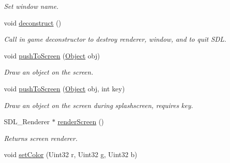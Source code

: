 \begin{DoxyCompactItemize}
\begin{DoxyCompactList}\small\item\em Set window name. \end{DoxyCompactList}\item 
void \hyperlink{classEngine_a9c0b65f41a2991857265f7be0a177e13}{deconstruct} ()\hypertarget{classEngine_a9c0b65f41a2991857265f7be0a177e13}{}\label{classEngine_a9c0b65f41a2991857265f7be0a177e13}

\begin{DoxyCompactList}\small\item\em Call in game deconstructor to destroy renderer, window, and to quit S\+DL. \end{DoxyCompactList}\item 
void \hyperlink{classEngine_a6adc1b843b8874274c0db6f95e705ef5}{push\+To\+Screen} (\hyperlink{classObject}{Object} obj)\hypertarget{classEngine_a6adc1b843b8874274c0db6f95e705ef5}{}\label{classEngine_a6adc1b843b8874274c0db6f95e705ef5}

\begin{DoxyCompactList}\small\item\em Draw an object on the screen. \end{DoxyCompactList}\item 
void \hyperlink{classEngine_a42800416f18b300577e3c0685103afe2}{push\+To\+Screen} (\hyperlink{classObject}{Object} obj, int key)\hypertarget{classEngine_a42800416f18b300577e3c0685103afe2}{}\label{classEngine_a42800416f18b300577e3c0685103afe2}

\begin{DoxyCompactList}\small\item\em Draw an object on the screen during splashscreen, requires key. \end{DoxyCompactList}\item 
S\+D\+L\+\_\+\+Renderer $\ast$ \hyperlink{classEngine_a0ace821c5c3f1b2015ff51a0c9bae1e7}{render\+Screen} ()\hypertarget{classEngine_a0ace821c5c3f1b2015ff51a0c9bae1e7}{}\label{classEngine_a0ace821c5c3f1b2015ff51a0c9bae1e7}

\begin{DoxyCompactList}\small\item\em Returns screen renderer. \end{DoxyCompactList}\item 
void \hyperlink{classEngine_a64fd3142c61b0aa18c6f642a4dba9f1f}{set\+Color} (Uint32 r, Uint32 g, Uint32 b)\hypertarget{classEngine_a64fd3142c61b0aa18c6f642a4dba9f1f}{}\label{classEngine_a64fd3142c61b0aa18c6f642a4dba9f1f}


\end{DoxyCompactItemize}
